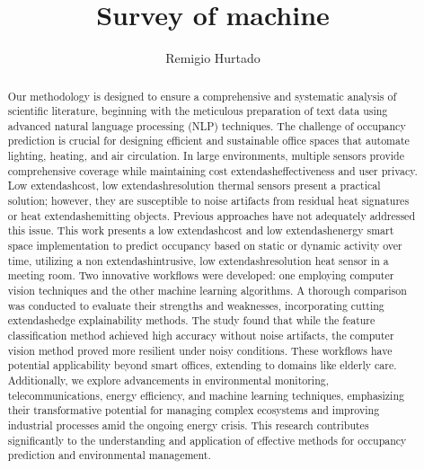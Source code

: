 \documentclass[runningheads]{llncs}
\begin{document}
%
\title{Survey of machine}
%
%
\author{Remigio Hurtado}
%
%
%
\maketitle    
%
\begin{abstract}
Our methodology is designed to ensure a comprehensive and systematic analysis of scientific literature, beginning with the meticulous preparation of text data using advanced natural language processing (NLP) techniques. The challenge of occupancy prediction is crucial for designing efficient and sustainable office spaces that automate lighting, heating, and air circulation. In large environments, multiple sensors provide comprehensive coverage while maintaining cost	extendash{}effectiveness and user privacy. Low	extendash{}cost, low	extendash{}resolution thermal sensors present a practical solution; however, they are susceptible to noise artifacts from residual heat signatures or heat	extendash{}emitting objects. Previous approaches have not adequately addressed this issue. This work presents a low	extendash{}cost and low	extendash{}energy smart space implementation to predict occupancy based on static or dynamic activity over time, utilizing a non	extendash{}intrusive, low	extendash{}resolution heat sensor in a meeting room. Two innovative workflows were developed: one employing computer vision techniques and the other machine learning algorithms. A thorough comparison was conducted to evaluate their strengths and weaknesses, incorporating cutting	extendash{}edge explainability methods. The study found that while the feature classification method achieved high accuracy without noise artifacts, the computer vision method proved more resilient under noisy conditions. These workflows have potential applicability beyond smart offices, extending to domains like elderly care. Additionally, we explore advancements in environmental monitoring, telecommunications, energy efficiency, and machine learning techniques, emphasizing their transformative potential for managing complex ecosystems and improving industrial processes amid the ongoing energy crisis. This research contributes significantly to the understanding and application of effective methods for occupancy prediction and environmental management.
\end{abstract}
\end{document}
